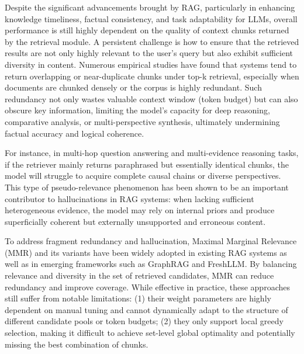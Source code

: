 \documentclass[11pt]{article}
\begin{document}
Despite the significant advancements brought by RAG, particularly in enhancing knowledge timeliness, factual consistency, and task adaptability for LLMs, overall performance is still highly dependent on the quality of context chunks returned by the retrieval module. A persistent challenge is how to ensure that the retrieved results are not only highly relevant to the user’s query but also exhibit sufficient diversity in content. Numerous empirical studies have found that systems tend to return overlapping or near-duplicate chunks under top-k retrieval, especially when documents are chunked densely or the corpus is highly redundant\cite*{8}\cite{9}. Such redundancy not only wastes valuable context window (token budget) but can also obscure key information, limiting the model’s capacity for deep reasoning, comparative analysis, or multi-perspective synthesis, ultimately undermining factual accuracy and logical coherence.

For instance, in multi-hop question answering and multi-evidence reasoning tasks, if the retriever mainly returns paraphrased but essentially identical chunks, the model will struggle to acquire complete causal chains or diverse perspectives. This type of pseudo-relevance phenomenon has been shown to be an important contributor to hallucinations in RAG systems: when lacking sufficient heterogeneous evidence, the model may rely on internal priors and produce superficially coherent but externally unsupported and erroneous content\cite{10}.

To address fragment redundancy and hallucination, Maximal Marginal Relevance (MMR) and its variants have been widely adopted in existing RAG systems as well as in emerging frameworks such as GraphRAG\cite{11} and FreshLLM\cite{12}. By balancing relevance and diversity in the set of retrieved candidates, MMR can reduce redundancy and improve coverage. While effective in practice, these approaches still suffer from notable limitations: (1) their weight parameters are highly dependent on manual tuning and cannot dynamically adapt to the structure of different candidate pools or token budgets; (2) they only support local greedy selection, making it difficult to achieve set-level global optimality and potentially missing the best combination of chunks.
\end{document}
